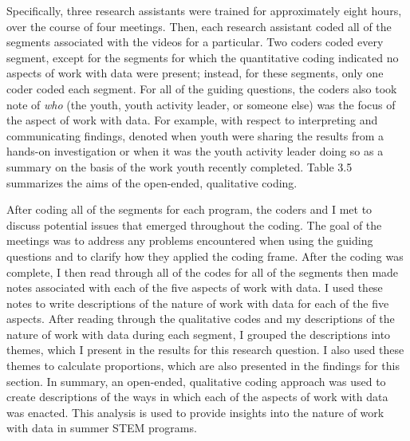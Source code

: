 \documentclass[]{msu-thesis}
\theoremstyle{definition}
\theoremstyle{definition}
\theoremstyle{definition}
\theoremstyle{remark}
\begin{document}
Specifically, three research assistants were trained for approximately
eight hours, over the course of four meetings. Then, each research
assistant coded all of the segments associated with the videos for a
particular. Two coders coded every segment, except for the segments for
which the quantitative coding indicated no aspects of work with data
were present; instead, for these segments, only one coder coded each
segment. For all of the guiding questions, the coders also took note of
\emph{who} (the youth, youth activity leader, or someone else) was the
focus of the aspect of work with data. For example, with respect to
interpreting and communicating findings, denoted when youth were sharing
the results from a hands-on investigation or when it was the youth
activity leader doing so as a summary on the basis of the work youth
recently completed. Table 3.5 summarizes the aims of the open-ended,
qualitative coding.

\begin{landscape}\begin{table}

\caption{\label{tab:unnamed-chunk-6}Coding Frame for the open-ended, qualitative coding of instructional episodes}
\centering
{}
\end{table}
\end{landscape}

After coding all of the segments for each program, the coders and I met
to discuss potential issues that emerged throughout the coding. The goal
of the meetings was to address any problems encountered when using the
guiding questions and to clarify how they applied the coding frame.
After the coding was complete, I then read through all of the codes for
all of the segments then made notes associated with each of the five
aspects of work with data. I used these notes to write descriptions of
the nature of work with data for each of the five aspects. After reading
through the qualitative codes and my descriptions of the nature of work
with data during each segment, I grouped the descriptions into themes,
which I present in the results for this research question. I also used
these themes to calculate proportions, which are also presented in the
findings for this section. In summary, an open-ended, qualitative coding
approach was used to create descriptions of the ways in which each of
the aspects of work with data was enacted. This analysis is used to
provide insights into the nature of work with data in summer STEM
programs.
\end{document}
